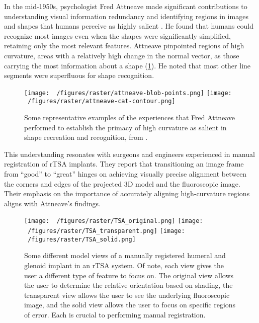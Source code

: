 In the mid-1950s, psychologist Fred Attneave made significant contributions to understanding visual information redundancy and identifying regions in images and shapes that humans perceive as highly salient \cite{attneaveQuantitativeStudyShape1956,attneaveInformationalAspectsVisual1954}.
He found that humans could recognize most images even when the shapes were significantly simplified, retaining only the most relevant features.
Attneave pinpointed regions of high curvature, areas with a relatively high change in the normal vector, as those carrying the most information about a shape (\cref{fig:attneave}).
He noted that most other line segments were superfluous for shape recognition.

\begin{figure}[h!]
  \centering
  \texttt{[image: ~/figures/raster/attneave-blob-points.png]}
  \texttt{[image: ~/figures/raster/attneave-cat-contour.png]}
  \caption{Some representative examples of the experiences that Fred Attneave performed to establish the primacy of high curvature as salient in shape recreation and recognition, from \cite{attneaveInformationalAspectsVisual1954}.}
  \label{fig:attneave}
\end{figure}

This understanding resonates with surgeons and engineers experienced in manual registration of rTSA implants.
They report that transitioning an image frame from “good” to “great” hinges on achieving visually precise alignment between the corners and edges of the projected 3D model and the fluoroscopic image.
Their emphasis on the importance of accurately aligning high-curvature regions aligns with Attneave's findings.


\begin{figure}[h!]
  \centering
  \texttt{[image: ~/figures/raster/TSA\_original.png]}
  \texttt{[image: ~/figures/raster/TSA\_transparent.png]}
  \texttt{[image: ~/figures/raster/TSA\_solid.png]}
  \caption{Some different model views of a manually registered humeral and glenoid implant in an rTSA system. Of note, each view gives the user a different type of feature to focus on. The original view allows the user to determine the relative orientation based on shading, the transparent view allows the user to see the underlying fluoroscopic image, and the solid view allows the user to focus on specific regions of error. Each is crucial to performing manual registration.}
  \label{fig:TSA-multiview}
\end{figure}

